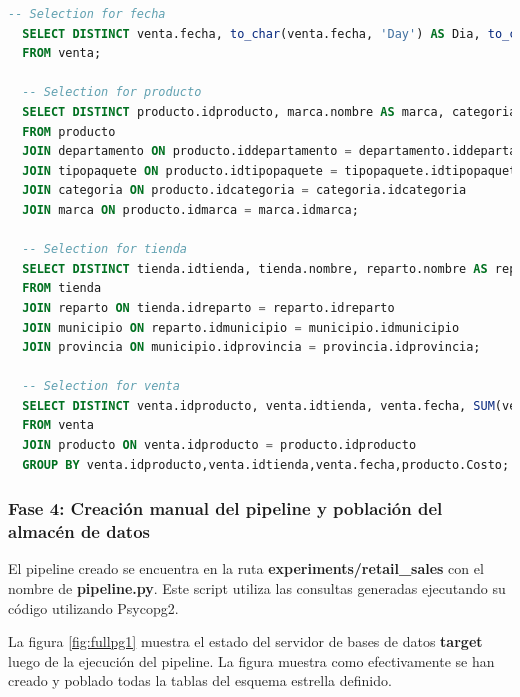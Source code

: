 \begin{lstlisting}[label={selectexp1}, caption={Consultas de selecci\'on generadas para el experimento 1}, language={sql}]
  -- Selection for fecha
  SELECT DISTINCT venta.fecha, to_char(venta.fecha, 'Day') AS Dia, to_char(venta.fecha, 'Month') AS Mes
  FROM venta;

  -- Selection for producto
  SELECT DISTINCT producto.idproducto, marca.nombre AS marca, categoria.nombre AS categoria, tipopaquete.nombre AS paquete, departamento.nombre AS departamento, departamento.descripcion AS descripcion, producto.nombre AS producto, producto.precio, producto.costo
  FROM producto
  JOIN departamento ON producto.iddepartamento = departamento.iddepartamento
  JOIN tipopaquete ON producto.idtipopaquete = tipopaquete.idtipopaquete
  JOIN categoria ON producto.idcategoria = categoria.idcategoria
  JOIN marca ON producto.idmarca = marca.idmarca;

  -- Selection for tienda
  SELECT DISTINCT tienda.idtienda, tienda.nombre, reparto.nombre AS reparto, municipio.nombre AS municipio, provincia.nombre AS provincia
  FROM tienda
  JOIN reparto ON tienda.idreparto = reparto.idreparto
  JOIN municipio ON reparto.idmunicipio = municipio.idmunicipio
  JOIN provincia ON municipio.idprovincia = provincia.idprovincia;

  -- Selection for venta
  SELECT DISTINCT venta.idproducto, venta.idtienda, venta.fecha, SUM(venta.cantidad_vendida) AS cantidad_vendida_total, SUM(venta.pago) AS importe_total, producto.Costo*SUM(venta.cantidad_vendida) AS coste_total, SUM(venta.pago)-producto.Costo*SUM(venta.cantidad_vendida) AS ganancia
  FROM venta
  JOIN producto ON venta.idproducto = producto.idproducto
  GROUP BY venta.idproducto,venta.idtienda,venta.fecha,producto.Costo;
\end{lstlisting}

\subsubsection{Fase 4: Creaci\'on manual del pipeline y poblaci\'on del almac\'en de datos}

El pipeline creado se encuentra en la ruta \textbf{experiments/retail\_sales} con el nombre de 
\textbf{pipeline.py}. Este script utiliza las consultas generadas ejecutando su c\'odigo utilizando 
Psycopg2.

La figura \ref{fig:fullpg1} muestra el estado del servidor de bases de datos \textbf{target} luego de la ejecuci\'on 
del pipeline. La figura muestra como efectivamente 
se han creado y poblado todas la tablas del esquema estrella definido.

